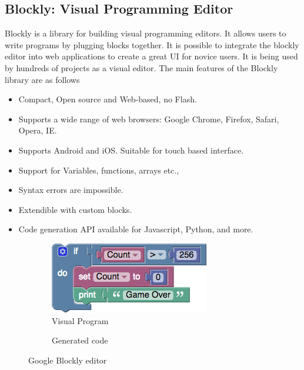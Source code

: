 \subsection{Blockly: Visual Programming Editor}
Blockly \cite{Blockly} is a library for building visual programming editors. It allows users to write programs by plugging blocks together. It is possible to integrate the blockly editor into web applications to create a great UI for novice users. It is being used by hundreds of projects as a visual editor. The main features of the Blockly library are as follows
\begin{itemize}[leftmargin={1cm},topsep={0pt},itemsep={0pt},partopsep={0pt},parsep={0pt}] 
\item Compact, Open source and Web-based, no Flash.
\item Supports a wide range of web browsers: Google Chrome, Firefox, Safari, Opera, IE.
\item Supports Android and iOS. Suitable for touch based interface.
\item Support for Variables, functions, arrays etc.,
\item Syntax errors are impossible.
\item Extendible with custom blocks.
\item Code generation API available for Javascript, Python, and more.
\end{itemize}
\begin{figure}[H]
\begin{subfigure}[h]{0.4\textwidth}
\includegraphics[width=\textwidth]{assets/blockly_sample.png}
\caption[Visual Program]{Visual Program}
\label{fig:blockly_sample}
\end{subfigure}
\hfill
\begin{subfigure}[h]{0.48\textwidth}

\caption[Generated code]{Generated code}
\label{fig:blockly_sample_code}
\end{subfigure}
\caption[Google Blockly editor]{Google Blockly editor}
\label{fig:pseudo_nodes}
\end{figure}
